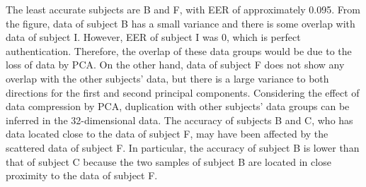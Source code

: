 \documentclass[sigchi,authordraft]{acmart}
\newcommand\figref[1]{\textbf{Figure~\ref{fig:#1}}}
\begin{document}

The least accurate subjects are B and F, with EER of approximately 0.095. From the figure, data of subject B has a small variance and there is some overlap with data of subject I. However, EER of subject I was 0, which is perfect authentication. Therefore, the overlap of these data groups would be due to the loss of data by PCA. On the other hand, data of subject F does not show any overlap with the other subjects' data, but there is a large variance to both directions for the first and second principal components. Considering the effect of data compression by PCA, duplication with other subjects' data groups can be inferred in the 32-dimensional data. The accuracy of subjects B and C, who has data located close to the data of subject F, may have been affected by the scattered data of subject F. In particular, the accuracy of subject B is lower than that of subject C because the two samples of subject B are located in close proximity to the data of subject F.\par


\end{document}
